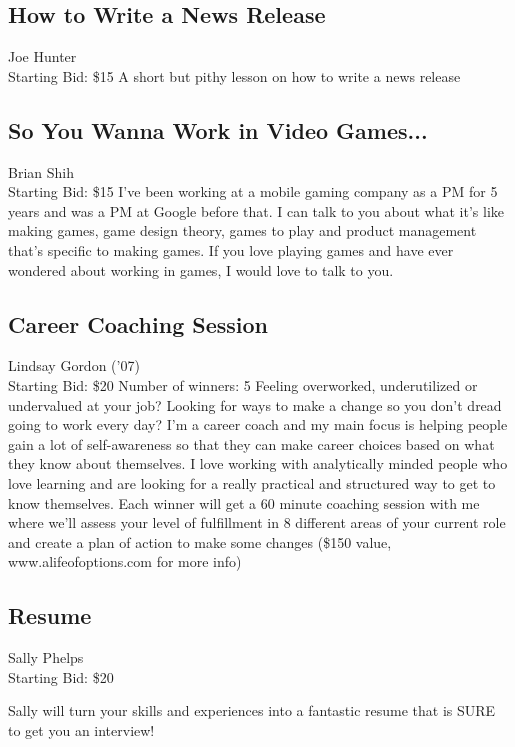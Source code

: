 \documentclass[11pt]{article}
\begin{document}
\subsection{How to Write a News Release }
Joe Hunter
\\
Starting Bid: \$15
\newline
A short but pithy lesson on how to write a news release
\subsection{So You Wanna Work in Video Games...}
Brian Shih
\\
Starting Bid: \$15
\newline
I’ve been working at a mobile gaming company as a PM for 5 years and was a PM at Google before that. I can talk to you about what it’s like making games, game design theory, games to play and product management that’s specific to making games. If you love playing games and have ever wondered about working in games, I would love to talk to you.
\subsection{Career Coaching Session}
Lindsay Gordon ('07)
\\
Starting Bid: \$20
\newline
Number of winners: 5
\newline
Feeling overworked, underutilized or undervalued at your job? Looking for ways to make a change so you don't dread going to work every day? I'm a career coach and my main focus is helping people gain a lot of self-awareness so that they can make career choices based on what they know about themselves. I love working with analytically minded people who love learning and are looking for a really practical and structured way to get to know themselves. Each winner will get a 60 minute coaching session with me where we'll assess your level of fulfillment in 8 different areas of your current role and create a plan of action to make some changes (\$150 value, www.alifeofoptions.com for more info)
\subsection{Resume}
Sally Phelps
\\
Starting Bid: \$20
\newline

Sally will turn your skills and experiences into a fantastic resume that is SURE to get you an interview!
\end{document}
